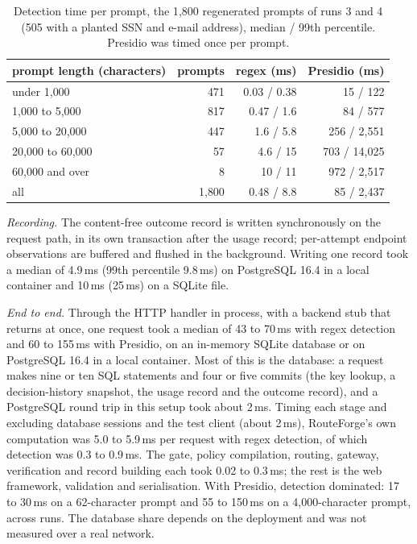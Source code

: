 \documentclass[11pt]{article}
\begin{document}
\begin{table}[t]
\centering
\small
\caption{Detection time per prompt, the 1{,}800 regenerated prompts of runs 3 and 4 (505 with a
planted SSN and e-mail address), median / 99th percentile. Presidio was timed once per prompt.}
\label{tab:detcost}
\begin{tabular}{@{}lrrr@{}}
\toprule
prompt length (characters) & prompts & regex (ms) & Presidio (ms) \\
\midrule
under 1{,}000 & 471 & 0.03 / 0.38 & 15 / 122 \\
1{,}000 to 5{,}000 & 817 & 0.47 / 1.6 & 84 / 577 \\
5{,}000 to 20{,}000 & 447 & 1.6 / 5.8 & 256 / 2{,}551 \\
20{,}000 to 60{,}000 & 57 & 4.6 / 15 & 703 / 14{,}025 \\
60{,}000 and over & 8 & 10 / 11 & 972 / 2{,}517 \\
all & 1{,}800 & 0.48 / 8.8 & 85 / 2{,}437 \\
\bottomrule
\end{tabular}
\end{table}

\emph{Recording.} The content-free outcome record is written synchronously on the request path,
in its own transaction after the usage record; per-attempt endpoint observations are buffered
and flushed in the background. Writing one record took a median of 4.9\,ms (99th percentile
9.8\,ms) on PostgreSQL 16.4 in a local container and 10\,ms (25\,ms) on a SQLite file.

\emph{End to end.} Through the HTTP handler in process, with a backend stub that returns at once,
one request took a median of 43 to 70\,ms with regex detection and 60 to 155\,ms with Presidio,
on an in-memory SQLite database or on PostgreSQL 16.4 in a local container. Most of this is the
database: a request makes nine or ten SQL statements and four or five commits (the key lookup, a
decision-history snapshot, the usage record and the outcome record), and a PostgreSQL round
trip in this setup took about 2\,ms. Timing each stage and excluding database sessions and the
test client (about 2\,ms), RouteForge's own computation was 5.0 to 5.9\,ms per request with regex
detection, of which detection was 0.3 to 0.9\,ms. The gate, policy compilation, routing, gateway,
verification and record building each took 0.02 to 0.3\,ms; the rest is the web framework,
validation and serialisation. With Presidio, detection dominated: 17 to 30\,ms on a 62-character
prompt and 55 to 150\,ms on a 4{,}000-character prompt, across runs. The database share depends
on the deployment and was not measured over a real network.
\end{document}
